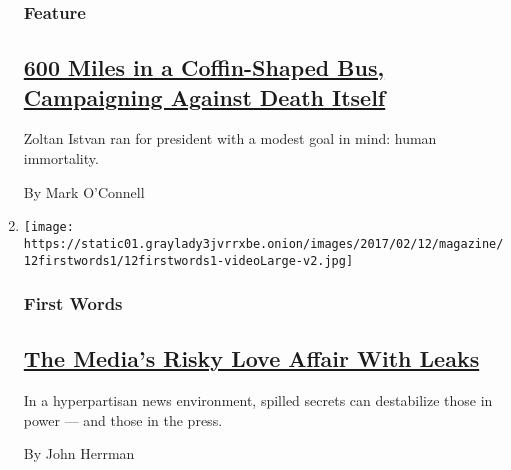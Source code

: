 \begin{enumerate}
  \hypertarget{feature-2}{%
  \subsubsection{Feature}\label{feature-2}}

  \hypertarget{600-miles-in-a-coffin-shaped-bus-campaigning-against-death-itself}{%
  \subsection{\texorpdfstring{\href{/2017/02/09/magazine/600-miles-in-a-coffin-shaped-bus-campaigning-against-death-itself.html}{600
  Miles in a Coffin-Shaped Bus, Campaigning Against Death
  Itself}}{600 Miles in a Coffin-Shaped Bus, Campaigning Against Death Itself}}\label{600-miles-in-a-coffin-shaped-bus-campaigning-against-death-itself}}

  Zoltan Istvan ran for president with a modest goal in mind: human
  immortality.

  By Mark O'Connell
\item
  \texttt{[image: https://static01.graylady3jvrrxbe.onion/images/2017/02/12/magazine/12firstwords1/12firstwords1-videoLarge-v2.jpg]}

  \hypertarget{first-words}{%
  \subsubsection{First Words}\label{first-words}}

  \hypertarget{the-medias-risky-love-affair-with-leaks}{%
  \subsection{\texorpdfstring{\href{/2017/02/06/magazine/the-medias-risky-love-affair-with-leaks.html}{The
  Media's Risky Love Affair With
  Leaks}}{The Media's Risky Love Affair With Leaks}}\label{the-medias-risky-love-affair-with-leaks}}

  In a hyperpartisan news environment, spilled secrets can destabilize
  those in power --- and those in the press.

  By John Herrman
\end{enumerate}

